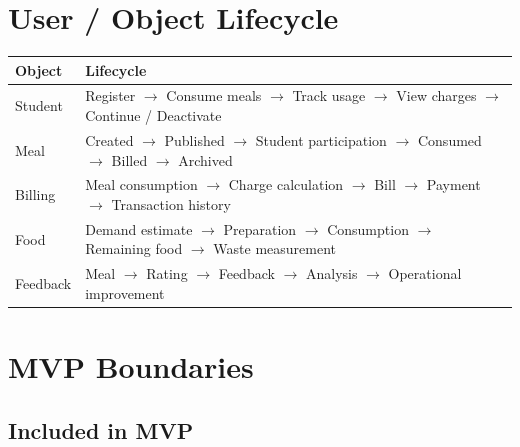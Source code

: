 \documentclass[12pt,a4paper]{article}
\begin{document}

\section{User / Object Lifecycle}

\begin{center}
\small
\begin{tabularx}{0.98\textwidth}{L{0.20\textwidth} Y}
\toprule
\textbf{Object} & \textbf{Lifecycle}\\
\midrule
Student & Register $\rightarrow$ Consume meals $\rightarrow$ Track usage
$\rightarrow$ View charges $\rightarrow$ Continue / Deactivate\\
Meal & Created $\rightarrow$ Published $\rightarrow$ Student participation
$\rightarrow$ Consumed $\rightarrow$ Billed $\rightarrow$ Archived\\
Billing & Meal consumption $\rightarrow$ Charge calculation $\rightarrow$ Bill
$\rightarrow$ Payment $\rightarrow$ Transaction history\\
Food & Demand estimate $\rightarrow$ Preparation $\rightarrow$ Consumption
$\rightarrow$ Remaining food $\rightarrow$ Waste measurement\\
Feedback & Meal $\rightarrow$ Rating $\rightarrow$ Feedback $\rightarrow$
Analysis $\rightarrow$ Operational improvement\\
\bottomrule
\end{tabularx}
\end{center}


\section{MVP Boundaries}

\subsection*{Included in MVP}
\end{document}
